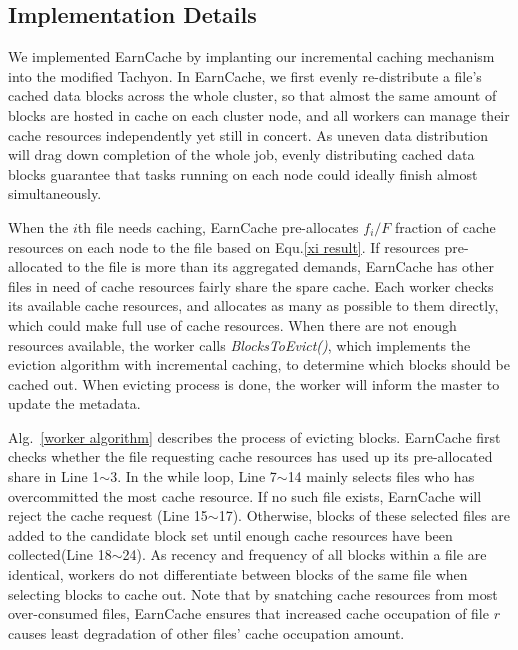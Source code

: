 \subsection{Implementation Details}\label{sec:share and fair}

We implemented EarnCache by implanting our incremental caching mechanism into the modified Tachyon\cite{tachyon}. In EarnCache, we first evenly re-distribute a file's cached data blocks across the whole cluster, so that almost the same amount of blocks are hosted in cache on each cluster node, and all workers can manage their cache resources independently yet still in concert. As uneven data distribution will drag down completion of the whole job, evenly distributing cached data blocks guarantee that tasks running on each node could ideally finish almost simultaneously.

When the $i$th file needs caching, EarnCache pre-allocates ${f_i}/{F}$ fraction of cache resources on each node to the file based on Equ.\ref{xi result}. If resources pre-allocated to the file is more than its aggregated demands, EarnCache has other files in need of cache resources fairly share the spare cache. 
Each worker checks its available cache resources, and allocates as many as possible to them directly, which could make full use of cache resources. 
When there are not enough resources available, the worker calls \emph{BlocksToEvict()}, which implements the eviction algorithm with incremental caching, to determine which blocks should be cached out. 
When evicting process is done, the worker will inform the master to update the metadata.

Alg.~\ref{worker algorithm} describes the process of evicting blocks. EarnCache first checks whether the file requesting cache resources has used up its pre-allocated share in Line 1$\sim$3. In the while loop, Line 7$\sim$14 mainly selects files who has overcommitted the most cache resource. If no such file exists, EarnCache will reject the cache request (Line 15$\sim$17). Otherwise, blocks of these selected files are added to the candidate block set until enough cache resources have been collected(Line 18$\sim$24). 
As recency and frequency of all blocks within a file are identical, 
workers do not differentiate between blocks of the same file when selecting blocks to cache out.
Note that by snatching cache resources from most over-consumed files, EarnCache ensures that increased cache occupation of file $r$ causes least degradation of other files' cache occupation amount.

